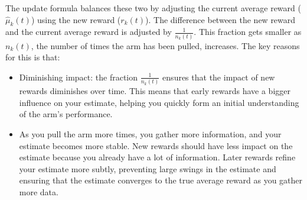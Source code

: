 \documentclass[letterpaper,10pt,english]{jupyterBook}
\begin{document}
\sphinxAtStartPar
The update formula balances these two by adjusting the current average reward (\(\hat{\mu}_k(t)\)) using the new reward (\(r_k(t)\)). The difference between the new reward and the current average reward is adjusted by \(\frac{1}{n_k(t)}\). This fraction gets smaller as \(n_k(t)\), the number of times the arm has been pulled, increases. The key reasons for this is that:
\begin{itemize}
\item {} 
\sphinxAtStartPar
Diminishing impact: the fraction \(\frac{1}{n_k(t)}\) ensures that the impact of new rewards diminishes over time. This means that early rewards have a bigger influence on your estimate, helping you quickly form an initial understanding of the arm’s performance.

\item {} 
\sphinxAtStartPar
As you pull the arm more times, you gather more information, and your estimate becomes more stable. New rewards should have less impact on the estimate because you already have a lot of information. Later rewards refine your estimate more subtly, preventing large swings in the estimate and ensuring that the estimate converges to the true average reward as you gather more data.

\end{itemize}
\end{document}
